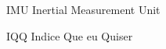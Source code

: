 
\begin{siglas}

    \item[IMU] Inertial Measurement Unit
    \item[IQQ] Indice Que eu Quiser
    
\end{siglas}

